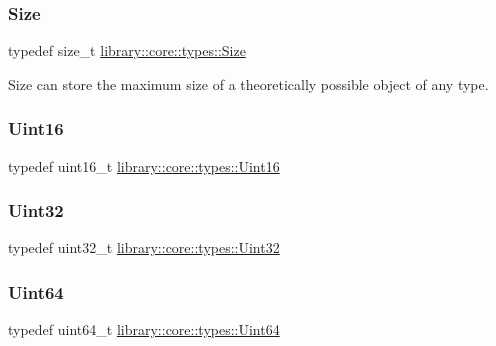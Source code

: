 \subsubsection{\texorpdfstring{Size}{Size}}
{\footnotesize\ttfamily typedef size\+\_\+t \mbox{\hyperlink{namespacelibrary_1_1core_1_1types_a701626ea1027888ebbb8cfd0ff7adab0}{library\+::core\+::types\+::\+Size}}}



Size can store the maximum size of a theoretically possible object of any type. 

\mbox{\label{namespacelibrary_1_1core_1_1types_a058aff3dd2661e18ff83255059561123}} 
\subsubsection{\texorpdfstring{Uint16}{Uint16}}
{\footnotesize\ttfamily typedef uint16\+\_\+t \mbox{\hyperlink{namespacelibrary_1_1core_1_1types_a058aff3dd2661e18ff83255059561123}{library\+::core\+::types\+::\+Uint16}}}

\mbox{\label{namespacelibrary_1_1core_1_1types_a17d56f5d789f5d86d10828c112c77be2}} 
\subsubsection{\texorpdfstring{Uint32}{Uint32}}
{\footnotesize\ttfamily typedef uint32\+\_\+t \mbox{\hyperlink{namespacelibrary_1_1core_1_1types_a17d56f5d789f5d86d10828c112c77be2}{library\+::core\+::types\+::\+Uint32}}}

\mbox{\label{namespacelibrary_1_1core_1_1types_a52eb5d32552dff72468cc9acee3dd70e}} 
\subsubsection{\texorpdfstring{Uint64}{Uint64}}
{\footnotesize\ttfamily typedef uint64\+\_\+t \mbox{\hyperlink{namespacelibrary_1_1core_1_1types_a52eb5d32552dff72468cc9acee3dd70e}{library\+::core\+::types\+::\+Uint64}}}

